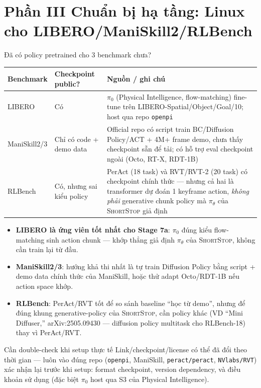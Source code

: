 \documentclass[aspectratio=169]{beamer}
\newcommand{\st}{\textsc{ShortStop}}
\newcommand{\good}[1]{\textcolor{green!40!black}{#1}}
\newcommand{\bad}[1]{\textcolor{red!60!black}{#1}}
\newcommand{\wip}[1]{\textcolor{orange!80!black}{#1}}
\begin{document}
\section{Phần III Chuẩn bị hạ tầng: Linux cho LIBERO/ManiSkill2/RLBench}

\begin{frame}[t,shrink=8]{Đã có policy pretrained cho 3 benchmark chưa?}
\footnotesize
\begin{center}
\begin{tabular}{@{}l l p{}@{}}
\toprule
\textbf{Benchmark} & \textbf{Checkpoint public?} & \textbf{Nguồn / ghi chú} \\
\midrule
LIBERO & \good{Có} & $\pi_0$ (Physical Intelligence, flow-matching) fine-tune trên LIBERO-Spatial/Object/Goal/10; host qua repo \texttt{openpi} \\
ManiSkill2/3 & \wip{Chỉ có code + demo data} & Official repo có script train BC/Diffusion Policy/ACT + 4M+ frame demo, chưa thấy checkpoint sẵn để tải; có hỗ trợ eval checkpoint ngoài (Octo, RT-X, RDT-1B) \\
RLBench & \good{Có}, nhưng \bad{sai kiểu policy} & PerAct (18 task) và RVT/RVT-2 (20 task) có checkpoint chính thức --- nhưng cả hai là transformer dự đoán 1 keyframe action, \emph{không phải} generative chunk policy mà $\pi_\theta$ của \st{} giả định \\
\bottomrule
\end{tabular}
\end{center}
\vspace{6pt}
\begin{itemize}
    \item \textbf{LIBERO là ứng viên tốt nhất cho Stage 7a}: $\pi_0$ đúng kiểu flow-matching sinh action chunk --- khớp thẳng giả định $\pi_\theta$ của \st{}, không cần train lại từ đầu.
    \item \textbf{ManiSkill2/3}: hướng khả thi nhất là tự train Diffusion Policy bằng script + demo data chính thức của ManiSkill, hoặc thử adapt Octo/RDT-1B nếu action space khớp.
    \item \textbf{RLBench}: PerAct/RVT tốt để so sánh baseline ``học từ demo'', nhưng để đúng khung generative-policy của \st{}, cần policy khác (VD ``Mini Diffuser,'' arXiv:2505.09430 --- diffusion policy multitask cho RLBench-18) thay vì PerAct/RVT.
\end{itemize}
\begin{alertblock}{Cần double-check khi setup thực tế}
Link/checkpoint/license có thể đã đổi theo thời gian --- luôn vào đúng repo (\texttt{openpi}, ManiSkill, \texttt{peract/peract}, \texttt{NVlabs/RVT}) xác nhận lại trước khi setup: format checkpoint, version dependency, và điều khoản sử dụng (đặc biệt $\pi_0$ host qua S3 của Physical Intelligence).
\end{alertblock}
\end{frame}
\end{document}
